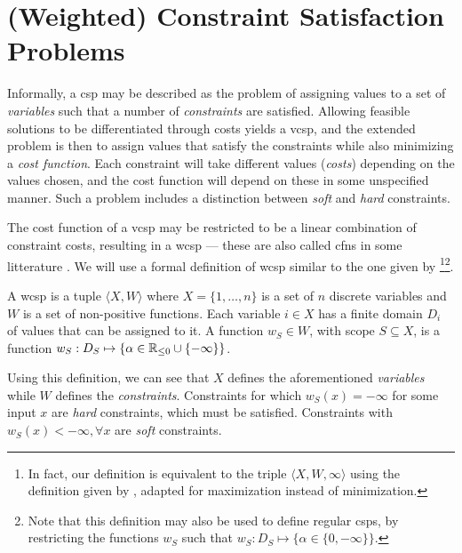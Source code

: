 \section{(Weighted) Constraint Satisfaction Problems}
Informally, a \gls{csp} may be described as the problem of assigning values to a set of \emph{variables} such that a number of \emph{constraints} are satisfied.
Allowing feasible solutions to be differentiated through costs yields a \gls{vcsp}, and the extended problem is then to assign values that satisfy the constraints while also minimizing a \emph{cost function}.
Each constraint will take different values (\emph{costs}) depending on the values chosen, and the cost function will depend on these in some unspecified manner.
Such a problem includes a distinction between \emph{soft} and \emph{hard} constraints.

The cost function of a \gls{vcsp} may be restricted to be a linear combination of constraint costs, resulting in a \gls{wcsp} --- these are also called \glspl{cfn} in some litterature \parencite{Allouche14}. We will use a formal definition of \gls{wcsp} similar to the one given by \textcite[\pno~3]{Allouche14}\footnote{In fact, our definition is equivalent to the triple \(\langle X, W, \infty \rangle\) using the definition given by \textcite{Allouche14}, adapted for maximization instead of minimization.}\footnote{Note that this definition may also be used to define regular \glspl{csp}, by restricting the functions \(w_S\) such that \(w_S : D_S \mapsto \{\alpha \in \{0, -\infty\}\}\).}.

\begin{definition}
	A \gls{wcsp} is a tuple \(\langle X, W \rangle\) where \(X=\{1,\dotsc,n\}\) is a set of \(n\) discrete variables and \(W\) is a set of non-positive functions.
	Each variable \(i \in X\) has a finite domain \(D_i\) of values that can be assigned to it.
	A function \(w_S \in W\), with scope \(S \subseteq X\), is a function \(w_S : D_S \mapsto \{\alpha \in \mathbb{R}_{\leq0} \cup \{-\infty\}\}\).
\end{definition}

Using this definition, we can see that \(X\) defines the aforementioned \emph{variables} while \(W\) defines the \emph{constraints}.
Constraints for which \(w_S({x}) = -\infty\) for some input \({x}\) are \emph{hard} constraints, which must be satisfied.
Constraints with \(w_S({x}) < -\infty, \forall {x}\) are \emph{soft} constraints.

